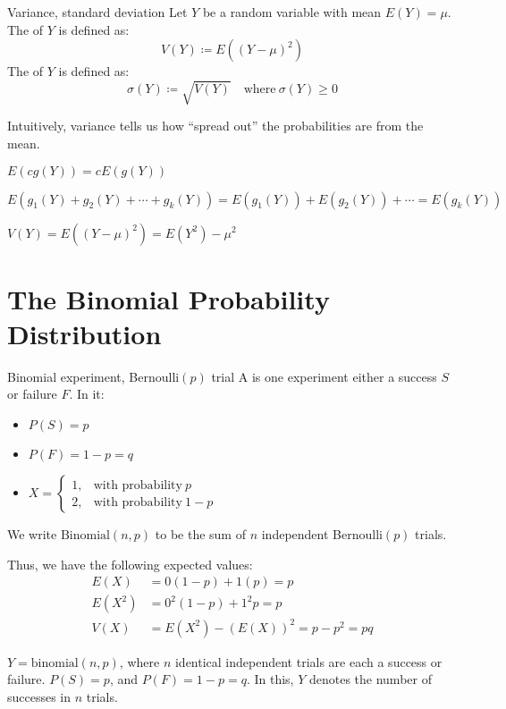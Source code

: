 \begin{dfnbox}{Variance, standard deviation}{}
    Let $Y$ be a random variable with mean $E(Y) = \mu$. The  of $Y$ is defined as:
    \[ V(Y) \coloneq E \left( (Y - \mu)^2 \right) \]
    The  of $Y$ is defined as:
    \[ \sigma(Y) \coloneq \sqrt{V(Y)} \quad \text{where}\ \sigma(Y) \geq 0 \]
\end{dfnbox}

Intuitively, variance tells us how ``spread out'' the probabilities are from the mean.

\begin{thmbox}{}{}
    $E(cg(Y)) = c E(g(Y))$
    
    $E(g_1(Y) + g_2(Y) + \cdots + g_k(Y)) = E(g_1(Y)) + E(g_2(Y)) + \cdots = E(g_k(Y))$

    $V(Y) = E((Y-\mu)^2) = E(Y^2) - \mu^2$
\end{thmbox}

\section{The Binomial Probability Distribution}

\begin{dfnbox}{Binomial experiment, Bernoulli$(p)$ trial}{}
    A  is one experiment either a success $S$ or failure $F$. In it:
    \begin{itemize}
        \item $P(S) = p$
        \item $P(F) = 1 - p = q$
        \item $X = \begin{cases}
            1, & \text{with probability}\ p \\
            2, & \text{with probability}\ 1 - p
        \end{cases}$
    \end{itemize}
    We write $\text{Binomial}(n, p)$ to be the sum of $n$ independent Bernoulli$(p)$ trials.
\end{dfnbox}

Thus, we have the following expected values:
\begin{align*}
    E(X) &= 0(1-p) + 1(p) = p \\
    E(X^2) &= 0^2 (1-p) + 1^2 p = p \\
    V(X) &= E(X^2) - (E(X))^2 = p - p^2 = pq
\end{align*}

$Y = \text{binomial}(n, p)$, where $n$ identical independent trials are each a success or failure. $P(S) = p$, and $P(F) = 1 - p = q$. In this, $Y$ denotes the number of successes in $n$ trials.


